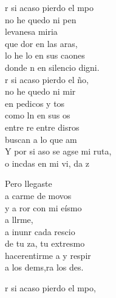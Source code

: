 \begin{cancion}%
	r si acaso pierdo el mpo \\
	no he quedo ni pen \\
	levanesa miria \\
	que dor en las aras, \\
	lo he lo en sus caones \\
	donde n en silencio digni. \\
	\jump
	r si acaso pierdo el ño, \\
	no he quedo ni mir\\
	en pedicos y tos\\
	como ln en sus os \\
	entre re entre disros\\
	buscan  a lo que am \\
	\jump
	Y por si aso se agse mi ruta,\\
	o incdas en mi vi, da z\jump\\
	\begin{chorus}%
		Pero llegaste   \\
		a carme de movos\\
		y a ror con mi eísmo\\
		a llrme, \\
		a inunr cada rescio\\
		de tu za, tu extresmo \\
		hacerentirme a y respir \\
		a los dems,ra los des. \jump\\
	\end{chorus}%
	r si acaso pierdo el mpo, \\

\end{cancion}
